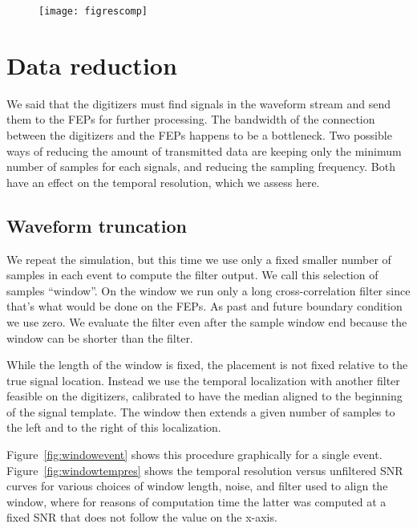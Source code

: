\begin{figure}
    \hspace{0.00\textwidth}
    \texttt{[image: figrescomp]}
    

\end{figure}

\section{Data reduction}

We said that the digitizers must find signals in the waveform stream and send
them to the FEPs for further processing. The bandwidth of the connection
between the digitizers and the FEPs happens to be a bottleneck. Two possible
ways of reducing the amount of transmitted data are keeping only the minimum
number of samples for each signals, and reducing the sampling frequency. Both
have an effect on the temporal resolution, which we assess here.

\subsection{Waveform truncation}

We repeat the simulation, but this time we use only a fixed smaller number of
samples in each event to compute the filter output. We call this selection of
samples ``window''. On the window we run only a long cross-correlation filter
since that's what would be done on the FEPs. As past and future boundary
condition we use zero. We evaluate the filter even after the sample window end
because the window can be shorter than the filter.

While the length of the window is fixed, the placement is not fixed relative to
the true signal location. Instead we use the temporal localization with another
filter feasible on the digitizers, calibrated to have the median aligned to the
beginning of the signal template. The window then extends a given number of
samples to the left and to the right of this localization.

Figure~\ref{fig:windowevent} shows this procedure graphically for a single
event. Figure~\ref{fig:windowtempres} shows the temporal resolution versus
unfiltered SNR curves for various choices of window length, noise, and filter
used to align the window, where for reasons of computation time the latter was
computed at a fixed SNR that does not follow the value on the x-axis.

